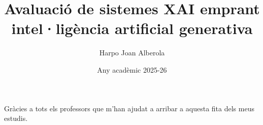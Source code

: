 \documentclass[catalan, GINF]{TFGEPSUIB}
\title{Avaluació de sistemes XAI emprant intel·ligència artificial generativa}
\author{Harpo Joan Alberola}
\date{Any acadèmic 2025-26}
\begin{document}
\portada
\portadainterior
\frontmatter

%
\cleartorecto \thispagestyle{empty}
\begin{agraiments}
Gràcies a tots els professors que m'han ajudat a arribar a aquesta fita dels meus estudis.
\end{agraiments}

\cleartorecto \tableofcontents


 

 

\mainmatter\pagestyle{ruled}










\appendix 
 



\backmatter



 
\end{document}

